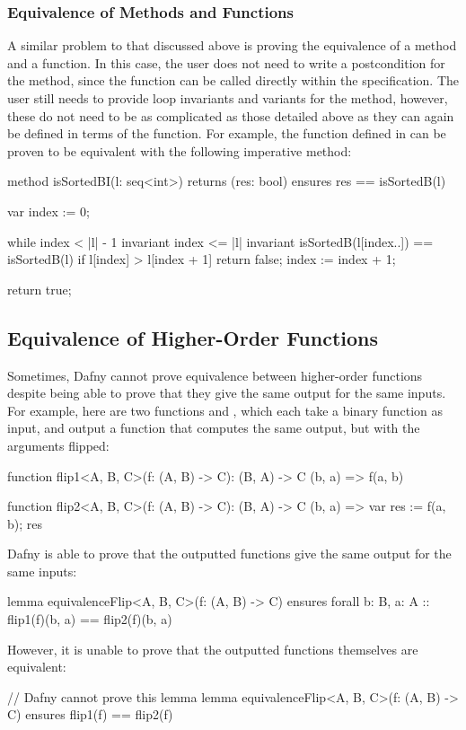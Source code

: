 \subsubsection{Equivalence of Methods and Functions}

A similar problem to that discussed above is proving the equivalence of a method and a function. In this case, the user does not need to write a postcondition for the method, since the function can be called directly within the specification. The user still needs to provide loop invariants and variants for the method, however, these do not need to be as complicated as those detailed above as they can again be defined in terms of the function. For example, the function  defined in  can be proven to be equivalent with the following imperative method:
\begin{dafny}
method isSortedBI(l: seq<int>) returns (res: bool)
  ensures res == isSortedB(l)
{
  var index := 0;

  while index < |l| - 1
    invariant index <= |l|
    invariant isSortedB(l[index..]) == isSortedB(l)
  {
    if l[index] > l[index + 1] {
        return false;
    }
    index := index + 1;
  }

  return true;
}
\end{dafny}

\subsection{Equivalence of Higher-Order Functions}\label{sec:higher-order}

Sometimes, Dafny cannot prove equivalence between higher-order functions despite being able to prove that they give the same output for the same inputs. For example, here are two functions  and , which each take a binary function as input, and output a function that computes the same output, but with the arguments flipped:
\begin{dafny}
function flip1<A, B, C>(f: (A, B) -> C): (B, A) -> C {
  (b, a) => f(a, b)
}

function flip2<A, B, C>(f: (A, B) -> C): (B, A) -> C {
  (b, a) => var res := f(a, b); res
}
\end{dafny}
%
Dafny is able to prove that the outputted functions give the same output for the same inputs:
\begin{dafny}
lemma equivalenceFlip<A, B, C>(f: (A, B) -> C)
  ensures forall b: B, a: A :: flip1(f)(b, a) == flip2(f)(b, a)
{}
\end{dafny}
%
However, it is unable to prove that the outputted functions themselves are equivalent:
\begin{dafny}
// Dafny cannot prove this lemma
lemma equivalenceFlip<A, B, C>(f: (A, B) -> C)
  ensures flip1(f) == flip2(f)
{}
\end{dafny}
